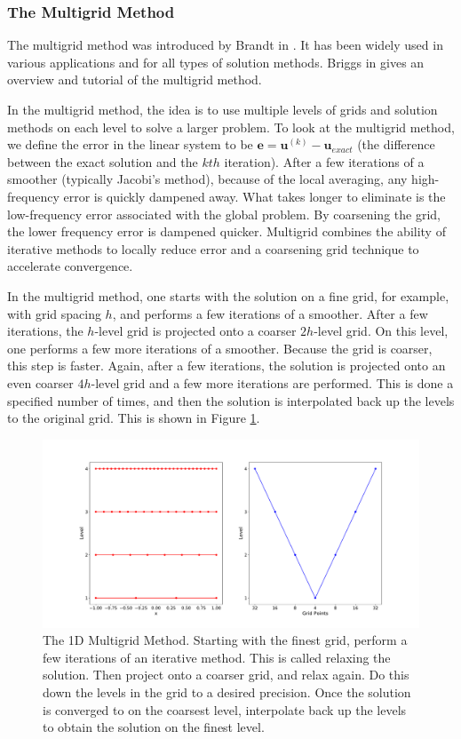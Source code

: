 \subsubsection{The Multigrid Method}
\label{subsub:multigrid-method}

The multigrid method was introduced by Brandt in \citep{brandt1977multi}. It has been widely used in various applications and for all types of solution methods. Briggs in \citep{briggs2000multigrid} gives an overview and tutorial of the multigrid method.

In the multigrid method, the idea is to use multiple levels of grids and solution methods on each level to solve a larger problem. To look at the multigrid method, we define the error in the linear system to be $\textbf{e} = \textbf{u}^{(k)} - \textbf{u}_{exact}$ (the difference between the exact solution and the $kth$ iteration). After a few iterations of a smoother (typically Jacobi's method), because of the local averaging, any high-frequency error is quickly dampened away. What takes longer to eliminate is the low-frequency error associated with the global problem. By coarsening the grid, the lower frequency error is dampened quicker. Multigrid combines the ability of iterative methods to locally reduce error and a coarsening grid technique to accelerate convergence.

In the multigrid method, one starts with the solution on a fine grid, for example, with grid spacing $h$, and performs a few iterations of a smoother. After a few iterations, the $h$-level grid is projected onto a coarser $2h$-level grid. On this level, one performs a few more iterations of a smoother. Because the grid is coarser, this step is faster. Again, after a few iterations, the solution is projected onto an even coarser $4h$-level grid and a few more iterations are performed. This is done a specified number of times, and then the solution is interpolated back up the levels to the original grid. This is shown in Figure \ref{fig:multigrid}.

\begin{figure}
    \centering
    \includegraphics[width=0.8\columnwidth]{figures/multigrid.pdf}
    \caption{The 1D Multigrid Method. Starting with the finest grid, perform a few iterations of an iterative method. This is called relaxing the solution. Then project onto a coarser grid, and relax again. Do this down the levels in the grid to a desired precision. Once the solution is converged to on the coarsest level, interpolate back up the levels to obtain the solution on the finest level.}
    \label{fig:multigrid}
\end{figure}

